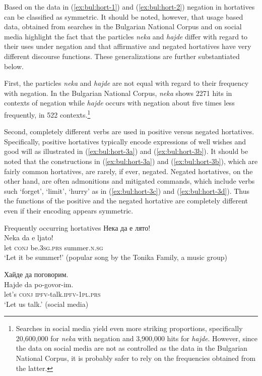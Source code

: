 \documentclass[output=paper,colorlinks=true, citecolor=brown]{langscibook}
\begin{document}
Based on the data in (\ref{ex:bul:hort-1}) and (\ref{ex:bul:hort-2}) negation in hortatives can be classified as symmetric. It should be noted, however, that usage based data, obtained from searches in the Bulgarian National Corpus and on social media highlight the fact that the particles \textit{neka} and \textit{hajde} differ with regard to their uses under negation and that affirmative and negated hortatives have very different discourse functions. These generalizations are further substantiated below.

First, the particles \textit{neka} and \textit{hajde} are not equal with regard to their frequency with negation. In the Bulgarian National Corpus, \textit{neka}  shows 2271 hits in contexts of negation while \textit{hajde} occurs with negation about five times less frequently, in 522 contexts.\footnote{Searches in social media yield even more striking proportions, specifically 20,600,000 for \textit{neka} with negation and  3,900,000 hits for \textit{hajde}. However, since the data on social media are not as controlled as the data in the Bulgarian National Corpus, it is probably safer to rely on the frequencies obtained from the latter.} 
    
Second, completely different verbs are used in positive versus negated hortatives. Specifically, positive hortatives typically encode expressions of  well wishes and good will as illustrated in (\ref{ex:bul:hort-3a}) and (\ref{ex:bul:hort-3b}). It should be noted that the constructions in (\ref{ex:bul:hort-3a}) and (\ref{ex:bul:hort-3b}), which are fairly common hortatives, are rarely, if ever, negated. Negated hortatives, on the other hand, are often admonitions and mitigated commands, which  include verbs such `forget', `limit', `hurry' as in (\ref{ex:bul:hort-3c}) and (\ref{ex:bul:hort-3d}). Thus the functions of the positive and the negated hortative are completely different even if their encoding appears symmetric. 
    
\ea Frequently occurring hortatives\label{ex:bul:hort-3}
  \ea Нека да е лято!\label{ex:bul:hort-3a}\\ 
  	\gll Neka da e ljato!\\
     let \textsc{conj} be.\textsc{3sg.prs} summer.\textsc{n.sg}\\
\glt `Let it be summer!' (popular song by the Tonika Family, a music group)

\ex Хайде да поговорим.\label{ex:bul:hort-3b}\\ 
	\gll Hajde da po-govor-im.\\
     let's \textsc{conj}  \textsc{ipfv}-talk.\textsc{ipfv}-\textsc{1pl.prs}\\
\glt `Let us talk.' (social media)
\end{document}
